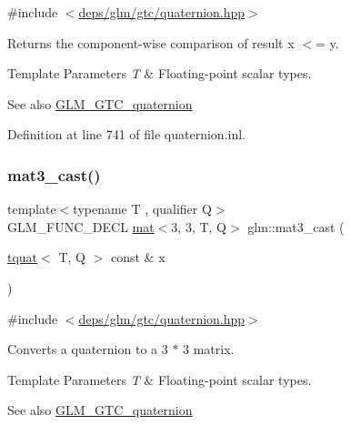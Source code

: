 {\ttfamily \#include $<$\hyperlink{gtc_2quaternion_8hpp}{deps/glm/gtc/quaternion.\+hpp}$>$}

Returns the component-\/wise comparison of result x $<$= y.


\begin{DoxyTemplParams}{Template Parameters}
{\em T} & Floating-\/point scalar types.\\
\hline
\end{DoxyTemplParams}
\begin{DoxySeeAlso}{See also}
\hyperlink{group__gtc__quaternion}{G\+L\+M\+\_\+\+G\+T\+C\+\_\+quaternion} 
\end{DoxySeeAlso}


Definition at line 741 of file quaternion.\+inl.

\mbox{\label{group__gtc__quaternion_ga6e88f15c94effe737c876d21ea0db101}} 
\subsubsection{\texorpdfstring{mat3\+\_\+cast()}{mat3\_cast()}}
{\footnotesize\ttfamily template$<$typename T , qualifier Q$>$ \\
G\+L\+M\+\_\+\+F\+U\+N\+C\+\_\+\+D\+E\+CL \hyperlink{structglm_1_1mat}{mat}$<$3, 3, T, Q$>$ glm\+::mat3\+\_\+cast (\begin{DoxyParamCaption}\item[{\hyperlink{structglm_1_1tquat}{tquat}$<$ T, Q $>$ const \&}]{x }\end{DoxyParamCaption})}



{\ttfamily \#include $<$\hyperlink{gtc_2quaternion_8hpp}{deps/glm/gtc/quaternion.\+hpp}$>$}

Converts a quaternion to a 3 $\ast$ 3 matrix.


\begin{DoxyTemplParams}{Template Parameters}
{\em T} & Floating-\/point scalar types.\\
\hline
\end{DoxyTemplParams}
\begin{DoxySeeAlso}{See also}
\hyperlink{group__gtc__quaternion}{G\+L\+M\+\_\+\+G\+T\+C\+\_\+quaternion} 
\end{DoxySeeAlso}


